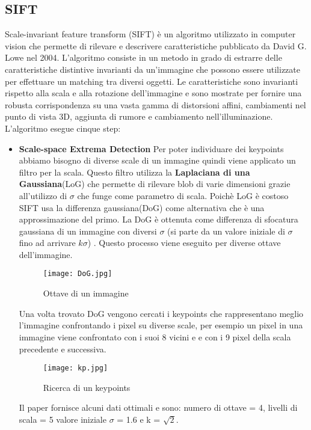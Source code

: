 \subsection{SIFT}
Scale-invariant feature transform (SIFT) è un algoritmo utilizzato in computer vision che permette di rilevare e descrivere caratteristiche pubblicato da David G. Lowe\cite{lowe04} nel 2004. L'algoritmo consiste in un metodo in grado di estrarre delle caratteristiche distintive invarianti da un'immagine che possono essere utilizzate per effettuare un matching tra diversi oggetti. Le caratteristiche sono invarianti rispetto alla scala e alla rotazione dell'immagine e sono mostrate per fornire una robusta corrispondenza su una vasta gamma di distorsioni affini, cambiamenti nel punto di vista 3D, aggiunta di rumore e cambiamento nell'illuminazione. L'algoritmo esegue cinque step:
\begin{itemize}
\item \textbf{Scale-space Extrema Detection}
Per poter individuare dei keypoints abbiamo bisogno di diverse scale di un immagine quindi viene applicato un filtro per la scala. Questo filtro utilizza la \textbf{Laplaciana di una Gaussiana}(LoG) che permette di rilevare blob di varie dimensioni grazie all'utilizzo di $\sigma$ che funge come parametro di scala. Poichè LoG è costoso SIFT usa la differenza gaussiana(DoG) come alternativa che è una approssimazione del primo. La DoG è ottenuta come differenza di sfocatura gaussiana di un immagine con diversi $\sigma$ (si parte da un valore iniziale di $\sigma$ fino ad arrivare $k\sigma$) . Questo processo viene eseguito per diverse ottave dell'immagine.
\begin{figure}[ht]
	\begin{center}
    \texttt{[image: DoG.jpg]}
    \caption{Ottave di un immagine}
    \label{fig:DoG}
    	\end{center}
\end{figure}
Una volta trovato DoG vengono cercati i keypoints che rappresentano meglio l'immagine confrontando i pixel su diverse scale, per esempio un pixel in una immagine viene confrontato con i suoi 8 vicini e e con i 9 pixel della scala precedente e successiva.
\begin{figure}[ht]
  \begin{center}
    \texttt{[image: kp.jpg]}
    \caption{Ricerca di un keypoints}
    \label{fig:kp}
    	\end{center}
\end{figure}
Il paper fornisce alcuni dati ottimali e sono: numero di ottave = 4, livelli di scala = 5 valore iniziale $\sigma$ = 1.6 e k = $\sqrt{2}$.

\end{itemize}

